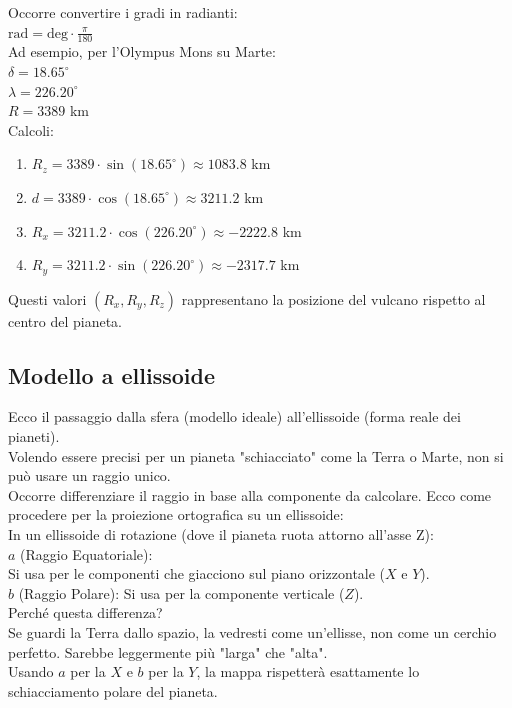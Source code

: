 \documentclass[a4paper,14pt]{article}
\begin{document}
Occorre convertire i gradi in radianti:\\
\(\text{rad}=\text{deg}\cdot \frac{\pi }{180}\)\\
Ad esempio, per l'Olympus Mons su Marte:\\
\(\delta =18.65^{\circ }\)\\
\(\lambda =226.20^{\circ }\)\\
\(R=3389\) km\\
Calcoli:\\
\begin{enumerate}
\item \(R_{z}=3389\cdot \sin (18.65^{\circ })\approx 1083.8\) km\\
\item \(d=3389\cdot \cos (18.65^{\circ })\approx 3211.2\) km\\
\item \(R_{x}=3211.2\cdot \cos (226.20^{\circ })\approx -2222.8\) km\\
\item \(R_{y}=3211.2\cdot \sin (226.20^{\circ })\approx -2317.7\) km\\
\end{enumerate}
Questi valori \((R_{x},R_{y},R_{z})\) rappresentano la posizione del vulcano rispetto al centro del pianeta.
\subsection{Modello a ellissoide}
Ecco il passaggio dalla sfera (modello ideale) all'ellissoide (forma reale dei pianeti).\\
Volendo essere precisi per un pianeta "schiacciato" come la Terra o Marte, non si può usare un raggio unico.\\
Occorre differenziare il raggio in base alla componente da calcolare.
Ecco come procedere per la proiezione ortografica su un ellissoide:\\
In un ellissoide di rotazione (dove il pianeta ruota attorno all'asse Z):\\
\(a\) (Raggio Equatoriale):\\
Si usa per le componenti che giacciono sul piano orizzontale (\(X\) e \(Y\)).\\
\(b\) (Raggio Polare): Si usa per la componente verticale (\(Z\)).\\
Perché questa differenza?\\
Se guardi la Terra dallo spazio, la vedresti come un'ellisse, non come un cerchio perfetto. Sarebbe leggermente più "larga" che "alta".\\
Usando \(a\) per la \(X\) e \(b\) per la \(Y\), la mappa rispetterà esattamente lo schiacciamento polare del pianeta.
\end{document}
